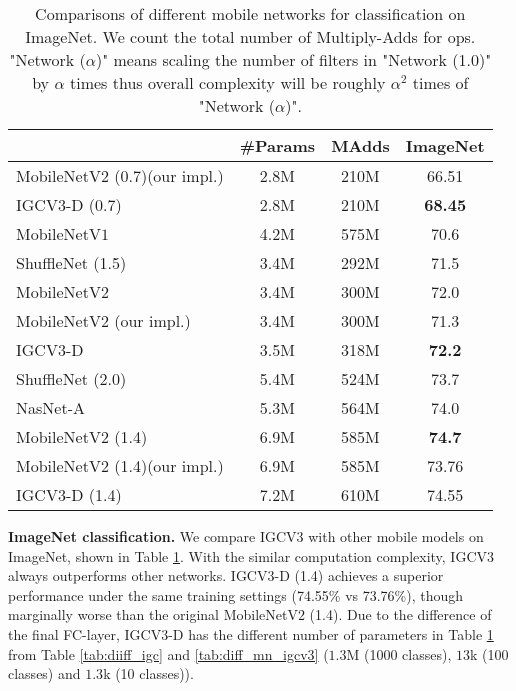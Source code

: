 \documentclass{bmvc2k}
\begin{document}
	\begin{table}[h]
		\centering
		\begin{tabular}{|l||c|c|c|}
			\hline
			& \#Params& MAdds&ImageNet\\
			\hline\hline
			MobileNetV$2$ (0.7)(our impl.)&2.8M& 210M &66.51\\
			IGCV$3$-D (0.7) & 2.8M & 210M & \textbf{68.45} \\
			\hline\hline
			MobileNetV$1$ \cite{howard2017mobilenets}&4.2M&575M&70.6\\
			ShuffleNet (1.5) \cite{zhang2017shufflenet} &3.4M&292M&71.5\\
			MobileNetV$2$ \cite{sandler2018inverted}&3.4M&300M&72.0\\
			MobileNetV$2$ (our impl.) &3.4M&300M&71.3\\
			IGCV3-D & 3.5M & 318M & \textbf{72.2} \\
			\hline\hline
			ShuffleNet (2.0) \cite{zhang2017shufflenet}&5.4M&524M&73.7\\
			NasNet-A \cite{ZophVSL17}&5.3M&564M&74.0\\
			MobileNetV$2$ (1.4) \cite{sandler2018inverted}&6.9M&585M&\textbf{74.7}\\
			MobileNetV$2$ (1.4)(our impl.)&6.9M&585M&73.76\\
			IGCV$3$-D (1.4) & 7.2M  & 610M&74.55 \\		
			\hline
		\end{tabular}
		\caption{Comparisons of different mobile networks for classification on ImageNet. We count the total number of Multiply-Adds for ops. "Network ($\alpha$)" means scaling the
			number of filters in "Network (1.0)" by
			$\alpha$ times thus overall
			complexity will be roughly $\alpha^2$
			times of "Network ($\alpha$)".}
		\label{tab:diff_imagenet}
	\end{table}
	\noindent\textbf{ImageNet classification.} We compare IGCV$3$ with other mobile models on ImageNet, shown in Table \ref{tab:diff_imagenet}. With the similar computation complexity, IGCV$3$ always outperforms other networks. IGCV$3$-D (1.4) achieves a superior performance under the same training settings (74.55\% vs 73.76\%), though marginally worse than the original MobileNetV$2$ (1.4). Due to the difference of the final FC-layer, IGCV$3$-D has the different number of parameters in Table \ref{tab:diff_imagenet} from Table \ref{tab:diiff_igc} and \ref{tab:diff_mn_igcv3} ($1.3$M (1000 classes), $13$k (100 classes) and $1.3$k (10 classes)).
	
\end{document}
